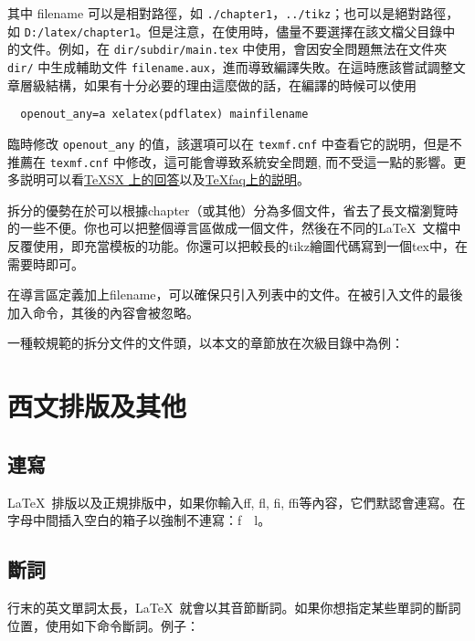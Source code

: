 其中 filename 可以是相對路徑，如 \verb|./chapter1|，\verb|../tikz|；也可以是絕對路徑，如 \verb|D:/latex/chapter1|。但是注意，在使用時，儘量不要選擇在該文檔父目錄中的文件。例如，在 \verb|dir/subdir/main.tex| 中使用，會因安全問題無法在文件夾 \verb|dir/| 中生成輔助文件 \verb|filename.aux|，進而導致編譯失敗。在這時應該嘗試調整文章層級結構，如果有十分必要的理由這麼做的話，在編譯的時候可以使用
\begin{verbatim}
  openout_any=a xelatex(pdflatex) mainfilename
\end{verbatim}
臨時修改 \verb|openout_any| 的值，該選項可以在 \verb|texmf.cnf| 中查看它的説明，但是不推薦在 \verb|texmf.cnf| 中修改，這可能會導致系統安全問題, 而不受這一點的影響。更多説明可以看\href{https://tex.stackexchange.com/questions/2209/how-can-i-include-the-file-somedir-file-tex-in-the-file-somedir-subdir-another}{\TeX SX 上的回答}以及\href{http://www.texfaq.org/FAQ-includeother}{\TeX faq上的説明}。

拆分的優勢在於可以根據chapter（或其他）分為多個文件，省去了長文檔瀏覽時的一些不便。你也可以把整個導言區做成一個文件，然後在不同的\LaTeX\ 文檔中反覆使用，即充當模板的功能。你還可以把較長的tikz繪圖代碼寫到一個tex中，在需要時即可。

在導言區定義加上filename，可以確保只引入列表中的文件。在被引入文件的最後加入命令，其後的內容會被忽略。

一種較規範的拆分文件的文件頭，以本文的章節放在次級目錄中為例：
\begin{latex}
\end{latex}

\section{西文排版及其他}
\subsection{連寫}
\LaTeX\ 排版以及正規排版中，如果你輸入ff, fl, fi, ffi等內容，它們默認會連寫。在字母中間插入空白的箱子以強制不連寫：f~~l。

\subsection{斷詞}
行末的英文單詞太長，\LaTeX\ 就會以其音節斷詞。如果你想指定某些單詞的斷詞位置，使用如下命令斷詞。例子：
\begin{latex}
\end{latex}

